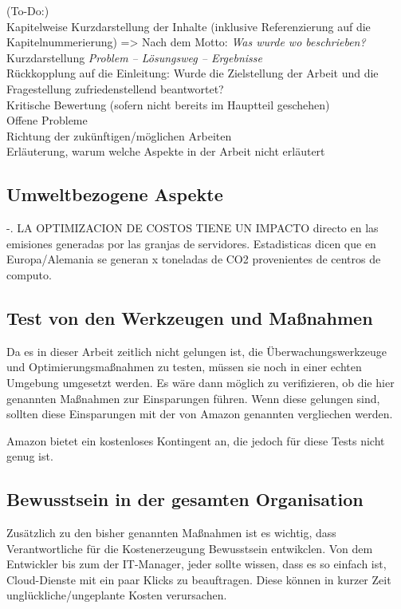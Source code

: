 (To-Do:)
\\Kapitelweise Kurzdarstellung der Inhalte (inklusive Referenzierung auf die \\Kapitelnummerierung) => Nach dem Motto: \textit{Was wurde wo beschrieben?}
\\Kurzdarstellung \textit{Problem – Lösungsweg – Ergebnisse}
\\Rückkopplung auf die Einleitung: Wurde die Zielstellung der Arbeit und die \\Fragestellung zufriedenstellend beantwortet?
\\Kritische Bewertung (sofern nicht bereits im Hauptteil geschehen)
\\Offene Probleme
\\Richtung der zukünftigen/möglichen Arbeiten
\\Erläuterung, warum welche Aspekte in der Arbeit nicht erläutert 

\subsection{Umweltbezogene Aspekte}
-. LA OPTIMIZACION DE COSTOS TIENE UN IMPACTO directo en las emisiones generadas por las granjas de servidores. 
Estadisticas dicen que en Europa/Alemania se generan x toneladas de CO2 provenientes de centros de computo.
\\
\subsection{Test von den Werkzeugen und Maßnahmen}
Da es in dieser Arbeit zeitlich nicht gelungen ist, die Überwachungswerkzeuge und Optimierungsmaßnahmen zu testen, müssen sie noch in einer echten Umgebung umgesetzt werden. Es wäre dann möglich zu verifizieren, ob die hier genannten Maßnahmen zur Einsparungen führen. Wenn diese gelungen sind, sollten diese Einsparungen mit der von Amazon genannten vergliechen werden.

Amazon bietet ein kostenloses Kontingent an, die jedoch für diese Tests nicht genug ist. 
\\
\subsection{Bewusstsein in der gesamten Organisation}
Zusätzlich zu den bisher genannten Maßnahmen ist es wichtig, dass Verantwortliche für die Kostenerzeugung Bewusstsein entwikclen. Von dem Entwickler bis zum der IT-Manager, jeder sollte wissen, dass es so einfach ist, Cloud-Dienste mit ein paar Klicks zu beauftragen. Diese können in kurzer Zeit unglückliche/ungeplante Kosten verursachen. 
\\
